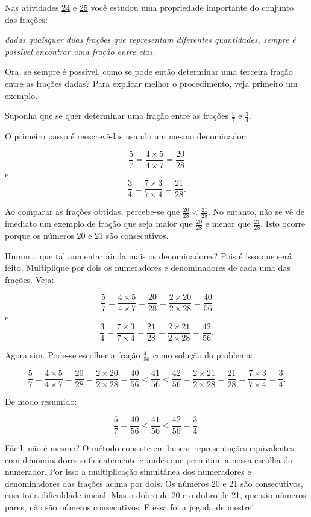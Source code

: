\begin{refletindo*}[breakable]{}{}

  Nas atividades \hyperref[chap4-ativ24]{24} e \hyperref[chap4-ativ25]{25} você estudou uma propriedade importante do conjunto das frações:

{\it  dadas quaisquer duas frações que representam diferentes quantidades, sempre é possível encontrar uma  fração entre elas.}


  Ora, se sempre é possível, como se pode então determinar uma terceira fração entre as frações dadas? Para explicar melhor o procedimento, veja primeiro um exemplo.

  Suponha que se quer determinar uma fração entre as frações   $\frac{5}{7}$ e   $\frac{3}{4}$.

  O primeiro passo é reescrevê-las usando um mesmo denominador:

  $$\dfrac{5}{7} = \dfrac{4 \times 5}{ 4 \times 7} = \dfrac{20}{28}$$
  e
  $$\dfrac{3}{4} = \dfrac{7 \times 3}{ 7 \times 4} = \dfrac{21}{28}.$$

  Ao comparar as frações obtidas, percebe-se que   $\frac{20}{28}<\frac{21}{28}$. No entanto, não se vê de imediato um exemplo de fração que seja maior que   $\frac{20}{28}$ e menor que   $\frac{21}{28}$. Isto ocorre porque os números 20 e 21 são consecutivos.

  Humm... que tal aumentar ainda mais os denominadores? Pois é isso que será feito.  Multiplique por dois os numeradores e denominadores de cada uma das frações. Veja:

  $$\dfrac{5}{7} = \dfrac{4 \times 5}{ 4 \times 7} = \dfrac{20}{28} = \dfrac{2 \times 20}{ 2 \times 28} = \dfrac{40}{56}$$
  e
  $$\dfrac{3}{4} = \dfrac{7 \times 3}{ 7 \times 4} = \dfrac{21}{28} = \dfrac{2 \times 21}{2 \times 28} = \dfrac{42}{56}.$$

  Agora sim. Pode-se escolher a fração   $\frac{41}{56}$ como solução do problema:

  $$\dfrac{5}{7} = \dfrac{4 \times 5}{ 4 \times 7} = \dfrac{20}{28} = \dfrac{2 \times 20}{ 2 \times 28} = \dfrac{40}{56} < \dfrac{41}{56} < \dfrac{42}{56} = \dfrac{2 \times 21}{2 \times 28} =  \dfrac{21}{28} = \dfrac{7 \times 3}{ 7 \times 4} = \dfrac{3}{4}.$$

  De modo resumido:

  $$\dfrac{5}{7} = \dfrac{40}{56} < \dfrac{41}{56} < \dfrac{42}{56} =\dfrac{3}{4}.$$

  Fácil, não é mesmo? O método consiste em buscar representações equivalentes com denominadores suficientemente grandes que permitam a nossa escolha do numerador. Por isso a multiplicação simultânea dos numeradores e denominadores das frações acima por dois. Os números 20 e 21 são consecutivos, essa foi a dificuldade inicial. Mas o dobro de 20 e o dobro de 21, que são números pares, não são números consecutivos. E essa foi a jogada de mestre!


\end{refletindo*}
